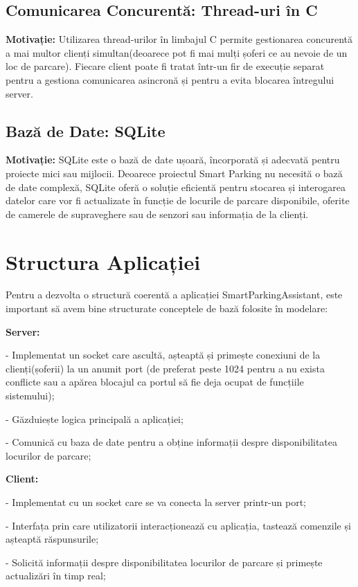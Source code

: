 \documentclass{article}
\begin{document}
\subsection{Comunicarea Concurentă: Thread-uri în C}
\textbf{Motivație:} Utilizarea thread-urilor în limbajul C permite gestionarea concurentă a mai multor clienți simultan(deoarece pot fi mai mulți șoferi ce au nevoie de un loc de parcare). Fiecare client poate fi tratat într-un fir de execuție separat pentru a gestiona comunicarea asincronă și pentru a evita blocarea întregului server.

\subsection{Bază de Date: SQLite}
\textbf{Motivație:} SQLite este o bază de date ușoară, încorporată și adecvată pentru proiecte mici sau mijlocii. Deoarece proiectul Smart Parking nu necesită o bază de date complexă, SQLite oferă o soluție eficientă pentru stocarea și interogarea datelor care vor fi actualizate în funcție de locurile de parcare disponibile, oferite de camerele de supraveghere sau de senzori sau informația de la clienți.

\section{Structura Aplicației}
Pentru a dezvolta o structură coerentă a aplicației SmartParkingAssistant, este important să avem bine structurate conceptele de bază folosite în modelare:

\textbf{Server:}

- Implementat un socket care ascultă, așteaptă și primește conexiuni de la clienți(șoferii) la un anumit port (de preferat peste 1024 pentru a nu exista conflicte sau a apărea blocajul ca portul să fie deja ocupat de funcțiile sistemului);

- Găzduiește logica principală a aplicației;

- Comunică cu baza de date pentru a obține informații despre disponibilitatea locurilor de parcare;

\textbf{Client:}

- Implementat cu un socket care se va conecta la server printr-un port;

- Interfața prin care utilizatorii interacționează cu aplicația, tastează comenzile și așteaptă răspunsurile;

- Solicită informații despre disponibilitatea locurilor de parcare și primește actualizări în timp real;
\end{document}
